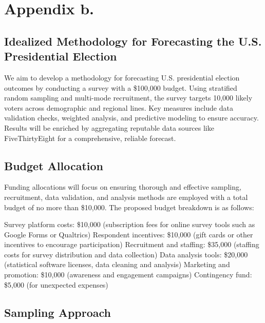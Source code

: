 \documentclass[
  letterpaper,
  DIV=11,
  numbers=noendperiod]{scrartcl}
\begin{document}
\hypertarget{appendix-b.}{%
\section*{Appendix b.}\label{appendix-b.}}

\hypertarget{idealized-methodology-for-forecasting-the-u.s.-presidential-election}{%
\subsection{Idealized Methodology for Forecasting the U.S. Presidential
Election}\label{idealized-methodology-for-forecasting-the-u.s.-presidential-election}}

We aim to develop a methodology for forecasting U.S. presidential
election outcomes by conducting a survey with a \$100,000 budget. Using
stratified random sampling and multi-mode recruitment, the survey
targets 10,000 likely voters across demographic and regional lines. Key
measures include data validation checks, weighted analysis, and
predictive modeling to ensure accuracy. Results will be enriched by
aggregating reputable data sources like FiveThirtyEight for a
comprehensive, reliable forecast.

\hypertarget{budget-allocation}{%
\subsection{Budget Allocation}\label{budget-allocation}}

Funding allocations will focus on ensuring thorough and effective
sampling, recruitment, data validation, and analysis methods are
employed with a total budget of no more than \$10,000. The proposed
budget breakdown is as follows:

Survey platform costs: \$10,000 (subscription fees for online survey
tools such as Google Forms or Qualtrics) Respondent incentives: \$10,000
(gift cards or other incentives to encourage participation) Recruitment
and staffing: \$35,000 (staffing costs for survey distribution and data
collection) Data analysis tools: \$20,000 (statistical software
licenses, data cleaning and analysis) Marketing and promotion: \$10,000
(awareness and engagement campaigns) Contingency fund: \$5,000 (for
unexpected expenses)

\hypertarget{sampling-approach}{%
\subsection{Sampling Approach}\label{sampling-approach}}
\end{document}
